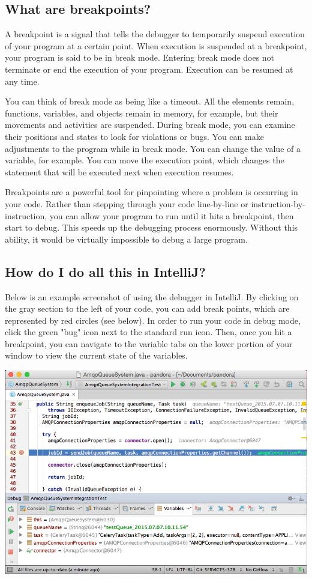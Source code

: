 \documentclass[oneside]{book}
\begin{document}
\subsection{What are breakpoints?}
A breakpoint is a signal that tells the debugger to temporarily suspend execution of your program at a certain point. When execution is suspended at a breakpoint, your program is said to be in break mode. Entering break mode does not terminate or end the execution of your program. Execution can be resumed at any time.\par
You can think of break mode as being like a timeout. All the elements remain, functions, variables, and objects remain in memory, for example, but their movements and activities are suspended. During break mode, you can examine their positions and states to look for violations or bugs. You can make adjustments to the program while in break mode. You can change the value of a variable, for example. You can move the execution point, which changes the statement that will be executed next when execution resumes.\par
Breakpoints are a powerful tool for pinpointing where a problem is occurring in your code. Rather than stepping through your code line-by-line or instruction-by-instruction, you can allow your program to run until it hits a breakpoint, then start to debug. This speeds up the debugging process enormously. Without this ability, it would be virtually impossible to debug a large program.\newpage
\subsection{How do I do all this in IntelliJ?}
Below is an example screenshot of using the debugger in IntelliJ. By clicking on the gray section to the left of your code, you can add break points, which are represented by red circles (see below). In order to run your code in debug mode, click the green "bug" icon next to the standard run icon. Then, once you hit a breakpoint, you can navigate to the variable tabs on the lower portion of your window to view the current state of the variables. \newline
\newline\begin{flushright}

\end{flushright}
\includegraphics[scale=0.5]{intellijdebugger.png}
\end{document}
